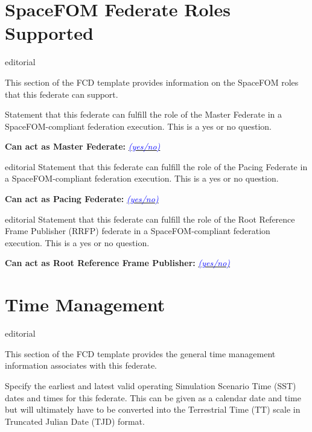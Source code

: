 \documentclass[11pt,english,letterpaper]{article}
\newcommand{\example}[1]{{\textcolor{blue}{\textit{#1}}}}
\begin{document}
\section*{SpaceFOM Federate Roles Supported}

\begin{shownto}{editorial}
{\color{red} This section of the FCD template provides information on the
SpaceFOM roles that this federate can support.

Statement that this federate can fulfill the role of the Master Federate in a
SpaceFOM-compliant federation execution. This is a yes or no question.}
\end{shownto}

\textbf{Can act as Master Federate: } \underline{\example{(yes/no)}}

\begin{shownto}{editorial}
{\color{red} Statement that this federate can fulfill the role of the Pacing
Federate in a SpaceFOM-compliant federation execution. This is a yes or no
question.}
\end{shownto}

\textbf{Can act as Pacing Federate: } \underline{\example{(yes/no)}}

\begin{shownto}{editorial}
{\color{red} Statement that this federate can fulfill the role of the Root
Reference Frame Publisher (RRFP) federate in a SpaceFOM-compliant federation
execution. This is a yes or no question.}
\end{shownto}

\textbf{Can act as Root Reference Frame Publisher: } \underline{\example{(yes/no)}}


\section*{Time Management}

\begin{shownto}{editorial}
{\color{red} This section of the FCD template provides the general time
management information associates with this federate.

Specify the earliest and latest valid operating Simulation Scenario Time (SST)
dates and times for this federate. This can be given as a calendar date and time
but will ultimately have to be converted into the Terrestrial Time (TT) scale in
Truncated Julian Date (TJD) format.}
\end{shownto}
\end{document}
